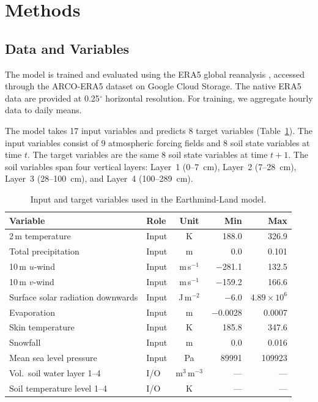\documentclass[11pt]{article}
\begin{document}
\section{Methods}
\label{sec:methods}

\subsection{Data and Variables}

The model is trained and evaluated using the ERA5 global reanalysis \citep{hersbach2020era5}, accessed through the ARCO-ERA5 dataset \citep{carver2023arcoera5} on Google Cloud Storage. The native ERA5 data are provided at 0.25$^\circ$ horizontal resolution. For training, we aggregate hourly data to daily means.

The model takes 17 input variables and predicts 8 target variables (Table~\ref{tab:variables}). The input variables consist of 9 atmospheric forcing fields and 8 soil state variables at time $t$. The target variables are the same 8 soil state variables at time $t+1$. The soil variables span four vertical layers: Layer~1 (0--7~cm), Layer~2 (7--28~cm), Layer~3 (28--100~cm), and Layer~4 (100--289~cm).

\begin{table}[htbp]
\centering
\caption{Input and target variables used in the Earthmind-Land model.}
\label{tab:variables}
\small
\begin{tabular}{@{}llcrr@{}}
\toprule
\textbf{Variable} & \textbf{Role} & \textbf{Unit} & \textbf{Min} & \textbf{Max} \\
\midrule
2\,m temperature & Input & K & 188.0 & 326.9 \\
Total precipitation & Input & m & 0.0 & 0.101 \\
10\,m $u$-wind & Input & m\,s$^{-1}$ & $-$281.1 & 132.5 \\
10\,m $v$-wind & Input & m\,s$^{-1}$ & $-$159.2 & 166.6 \\
Surface solar radiation downwards & Input & J\,m$^{-2}$ & $-$6.0 & $4.89\times10^6$ \\
Evaporation & Input & m & $-$0.0028 & 0.0007 \\
Skin temperature & Input & K & 185.8 & 347.6 \\
Snowfall & Input & m & 0.0 & 0.016 \\
Mean sea level pressure & Input & Pa & 89991 & 109923 \\
\midrule
Vol.\ soil water layer 1--4 & I/O & m$^3$\,m$^{-3}$ & --- & --- \\
Soil temperature level 1--4 & I/O & K & --- & --- \\
\bottomrule
\end{tabular}
\end{table}
\end{document}
